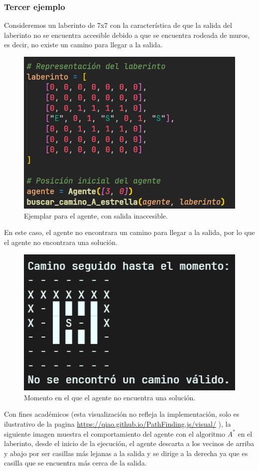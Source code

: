 \subsubsection*{Tercer ejemplo}

Consideremos un laberinto de 7x7 con la característica de que la salida del laberinto no 
se encuentra accesible debido a que se encuentra rodeada de muros, es decir, no existe un camino para llegar a la salida.

\begin{figure}[H]
    \centering
    \includegraphics[width=0.5\linewidth]{IMA/Laberinto3.png} 
    \caption{Ejemplar para el agente, con salida inaccesible.} 
    \label{fig:ejemplo} 
\end{figure}

En este caso, el agente no encontrara un camino para llegar a la salida, por lo que el agente no encontrara una solución.

\begin{figure}[H]
    \centering
    \includegraphics[width=0.5\linewidth]{IMA/RLaberinto3.png} 
    \caption{Momento en el que el agente no encuentra una solución.} 
    \label{fig:ejemplo} 
\end{figure}

Con fines académicos (esta visualización no refleja la implementación, solo es ilustrativo de la 
pagina \url{https://qiao.github.io/PathFinding.js/visual/} ), la siguiente imagen muestra el comportamiento 
del agente con el algoritmo $A^{*}$ en el laberinto, desde el inicio de la ejecución, el agente descarta a 
los vecinos de arriba y abajo por ser casillas más lejanas a la salida y se dirige a la derecha ya que es 
casilla que se encuentra más cerca de la salida.\\ 


